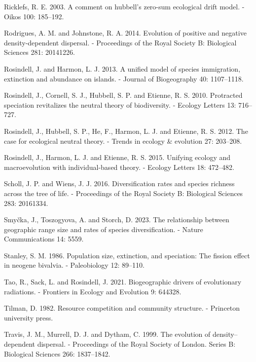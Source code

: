 \documentclass[
  letterpaper,
  DIV=11,
  numbers=noendperiod]{scrartcl}
\newlength{\cslhangindent}
\newenvironment{CSLReferences}[2] %
 {\begin{list}{}{%
  \setlength{\itemindent}{0pt}
  \setlength{\leftmargin}{0pt}
  \setlength{\parsep}{0pt}
  \ifodd #1
   \setlength{\leftmargin}{\cslhangindent}
   \setlength{\itemindent}{-1\cslhangindent}
  \fi
  \setlength{\itemsep}{#2\baselineskip}}}
 {\end{list}}
\begin{document}
\begin{CSLReferences}{1}{1}
Ricklefs, R. E. 2003. A comment on hubbell's zero-sum ecological drift
model. - Oikos 100: 185--192.

Rodrigues, A. M. and Johnstone, R. A. 2014. Evolution of positive and
negative density-dependent dispersal. - Proceedings of the Royal Society
B: Biological Sciences 281: 20141226.

Rosindell, J. and Harmon, L. J. 2013. A unified model of species
immigration, extinction and abundance on islands. - Journal of
Biogeography 40: 1107--1118.

Rosindell, J., Cornell, S. J., Hubbell, S. P. and Etienne, R. S. 2010.
Protracted speciation revitalizes the neutral theory of biodiversity. -
Ecology Letters 13: 716--727.

Rosindell, J., Hubbell, S. P., He, F., Harmon, L. J. and Etienne, R. S.
2012. The case for ecological neutral theory. - Trends in ecology \&
evolution 27: 203--208.

Rosindell, J., Harmon, L. J. and Etienne, R. S. 2015. Unifying ecology
and macroevolution with individual-based theory. - Ecology Letters 18:
472--482.

Scholl, J. P. and Wiens, J. J. 2016. Diversification rates and species
richness across the tree of life. - Proceedings of the Royal Society B:
Biological Sciences 283: 20161334.

Smyčka, J., Toszogyova, A. and Storch, D. 2023. The relationship between
geographic range size and rates of species diversification. - Nature
Communications 14: 5559.

Stanley, S. M. 1986. Population size, extinction, and speciation: The
fission effect in neogene bivalvia. - Paleobiology 12: 89--110.

Tao, R., Sack, L. and Rosindell, J. 2021. Biogeographic drivers of
evolutionary radiations. - Frontiers in Ecology and Evolution 9: 644328.

Tilman, D. 1982. Resource competition and community structure. -
Princeton university press.

Travis, J. M., Murrell, D. J. and Dytham, C. 1999. The evolution of
density--dependent dispersal. - Proceedings of the Royal Society of
London. Series B: Biological Sciences 266: 1837--1842.


\end{CSLReferences}
\end{document}

